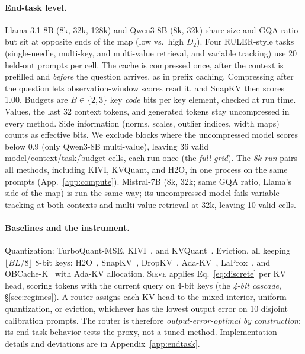 \documentclass{article}
\newcommand{\sieve}{\textsc{Sieve}}
\theoremstyle{definition}
\begin{document}
\paragraph{End-task level.}
Llama-3.1-8B (8k, 32k, 128k) and Qwen3-8B (8k, 32k) share size and GQA ratio but sit at opposite ends of the map (low vs.\ high $D_2$).  Four RULER-style tasks~\citep{hsieh2024ruler} (single-needle, multi-key, and multi-value retrieval, and variable tracking) use 20 held-out prompts per cell.  The cache is compressed once, after the context is prefilled and \emph{before} the question arrives, as in prefix caching.  Compressing after the question lets observation-window scores read it, and SnapKV then scores 1.00.  Budgets are $B\in\{2,3\}$ key \emph{code} bits per key element, checked at run time.  Values, the last 32 context tokens, and generated tokens stay uncompressed in every method.  Side information (norms, scales, outlier indices, width maps) counts as effective bits.  We exclude blocks where the uncompressed model scores below 0.9 (only Qwen3-8B multi-value), leaving 36 valid model/context/task/budget cells, each run once (the \emph{full grid}).  The \emph{8k run} pairs all methods, including KIVI, KVQuant, and H2O, in one process on the same prompts (App.~\ref{app:compute}).  Mistral-7B (8k, 32k; same GQA ratio, Llama's side of the map) is run the same way; its uncompressed model fails variable tracking at both contexts and multi-value retrieval at 32k, leaving 10 valid cells.

\paragraph{Baselines and the instrument.}
Quantization: TurboQuant-MSE, KIVI~\citep{liu2024kivi}, and KVQuant~\citep{hooper2024kvquant}.  Eviction, all keeping $\lfloor BL/8\rfloor$ 8-bit keys: H2O~\citep{zhang2023h2o}, SnapKV~\citep{li2024snapkv}, DropKV~\citep{zhang2026dropkv}, Ada-KV~\citep{feng2024adakv}, LaProx~\citep{mai2026laprox}, and OBCache-K~\citep{gu2026obcache} with Ada-KV allocation.  \sieve{} applies Eq.~\ref{eq:discrete} per KV head, scoring tokens with the current query on 4-bit keys (the \emph{4-bit cascade}, \S\ref{sec:regimes}).  A router assigns each KV head to the mixed interior, uniform quantization, or eviction, whichever has the lowest output error on 10 disjoint calibration prompts.  The router is therefore \emph{output-error-optimal by construction}; its end-task behavior tests the proxy, not a tuned method.  Implementation details and deviations are in Appendix~\ref{app:endtask}.
\end{document}
